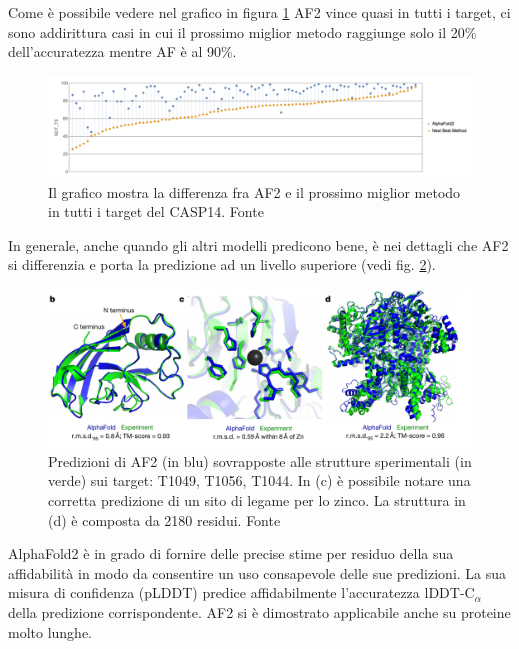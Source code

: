Come è possibile vedere nel grafico in figura \ref{fig:modelli-casp14} AF2 vince quasi in tutti i target, ci sono addirittura casi in cui il prossimo miglior metodo raggiunge solo il 20\% dell'accuratezza mentre AF è al 90\%.

\begin{figure}[!htb]
	\centering
	\includegraphics[scale=0.4]{images/models1.png}
	\caption{Il grafico mostra la differenza fra AF2 e il prossimo miglior metodo in tutti i target del CASP14. Fonte\cite{moAlq}}
	\label{fig:modelli-casp14}
\end{figure}

In generale, anche quando gli altri modelli predicono bene, è nei dettagli che AF2 si differenzia e porta la predizione ad un livello superiore (vedi fig. \ref{fig:af2-details}).

\begin{figure}[!htb]
	\centering
	\includegraphics[scale=0.5]{images/af2-details.png}
	\caption{Predizioni di AF2 (in blu) sovrapposte alle strutture sperimentali (in verde) sui target: T1049, T1056, T1044. In (c) è possibile notare una corretta predizione di un sito di legame per lo zinco. La struttura in (d) è composta da 2180 residui. Fonte\cite{jumper2021highly}}
	\label{fig:af2-details}
\end{figure}

\par AlphaFold2 è in grado di fornire delle precise stime per residuo della sua affidabilità in modo da consentire un uso consapevole delle sue predizioni. La sua misura di confidenza (pLDDT) predice affidabilmente l'accuratezza lDDT-C$_{\alpha}$ della predizione corrispondente. AF2 si è dimostrato applicabile anche su proteine molto lunghe. 

